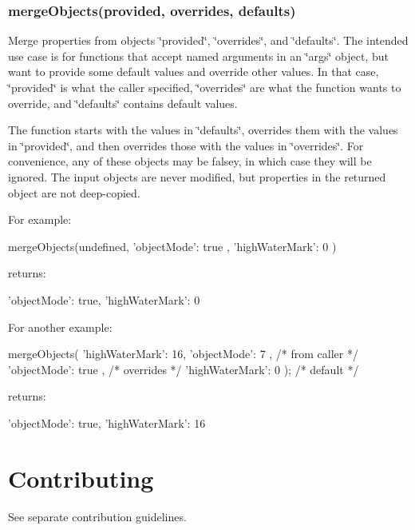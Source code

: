 \subsubsection*{merge\+Objects(provided, overrides, defaults)}

Merge properties from objects \char`\"{}provided\char`\"{}, \char`\"{}overrides\char`\"{}, and \char`\"{}defaults\char`\"{}. The intended use case is for functions that accept named arguments in an \char`\"{}args\char`\"{} object, but want to provide some default values and override other values. In that case, \char`\"{}provided\char`\"{} is what the caller specified, \char`\"{}overrides\char`\"{} are what the function wants to override, and \char`\"{}defaults\char`\"{} contains default values.

The function starts with the values in \char`\"{}defaults\char`\"{}, overrides them with the values in \char`\"{}provided\char`\"{}, and then overrides those with the values in \char`\"{}overrides\char`\"{}. For convenience, any of these objects may be falsey, in which case they will be ignored. The input objects are never modified, but properties in the returned object are not deep-\/copied.

For example\+: \begin{DoxyVerb}mergeObjects(undefined, { 'objectMode': true }, { 'highWaterMark': 0 })
\end{DoxyVerb}


returns\+: \begin{DoxyVerb}{ 'objectMode': true, 'highWaterMark': 0 }
\end{DoxyVerb}


For another example\+: \begin{DoxyVerb}mergeObjects(
    { 'highWaterMark': 16, 'objectMode': 7 }, /* from caller */
    { 'objectMode': true },                   /* overrides */
    { 'highWaterMark': 0 });                  /* default */
\end{DoxyVerb}


returns\+: \begin{DoxyVerb}{ 'objectMode': true, 'highWaterMark': 16 }
\end{DoxyVerb}


\section*{Contributing}

See separate contribution guidelines. 